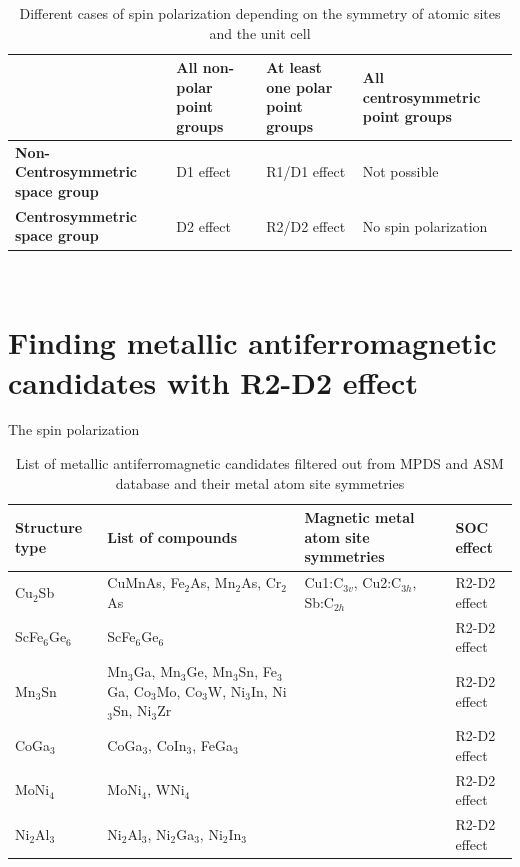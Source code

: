 \documentclass[11pt,edeposit,draftthesis]{uiucthesis2020}
\begin{document}
\begin{mainmatter}
\begin{table}
\caption{\label{tab:RD_effect} 
Different cases of spin polarization depending on the symmetry of atomic sites and the unit cell \cite{Zhang2014}}
\centering
\begin{tabular}{>{\raggedright\arraybackslash}p{5cm}>{\raggedright\arraybackslash}p{3cm}>{\raggedright\arraybackslash}p{3cm}>{\raggedright\arraybackslash}p{3cm}}
\hline\hline
\textbf{} & \textbf{All non-polar point groups} & \textbf{At least one polar point groups} & \textbf{All centrosymmetric point groups}\\
\hline
\textbf{Non-Centrosymmetric space group} & D1 effect & R1/D1 effect & Not possible\\
\hline
\textbf{Centrosymmetric space group} & D2 effect & R2/D2 effect & No spin polarization\\
\hline\hline
\end{tabular}
~\\
\end{table}

\section{Finding metallic antiferromagnetic candidates with R2-D2 effect}

The spin polarization 

\begin{table}
\caption{\label{tab:metallic_afm_candidates} 
List of metallic antiferromagnetic candidates filtered out from MPDS and ASM database and their metal atom site symmetries}
\begin{tabular}{>{\raggedright\arraybackslash}p{3cm}>{\raggedright\arraybackslash}p{4cm}>{\raggedright\arraybackslash}p{4cm}>{\raggedright\arraybackslash}p{3cm}}
\hline\hline
\textbf{Structure type} & \textbf{List of compounds} & \textbf{Magnetic metal atom site symmetries} & \textbf{SOC effect}\\
\hline\hline
Cu$_2$Sb & CuMnAs, Fe$_2$As, Mn$_2$As, Cr$_2$As & Cu1:C$_{3v}$, Cu2:C$_{3h}$, Sb:C$_{2h}$ & R2-D2 effect\\
\hline
ScFe$_6$Ge$_6$ & ScFe$_6$Ge$_6$ & & R2-D2 effect\\
\hline
Mn$_3$Sn & Mn$_3$Ga, Mn$_3$Ge, Mn$_3$Sn, Fe$_3$Ga, Co$_3$Mo, Co$_3$W, Ni$_3$In, Ni$_3$Sn, Ni$_3$Zr &  & R2-D2 effect\\
\hline
CoGa$_3$ & CoGa$_3$, CoIn$_3$, FeGa$_3$ &  & R2-D2 effect\\
\hline
MoNi$_4$ & MoNi$_4$, WNi$_4$ &  & R2-D2 effect\\
\hline
Ni$_2$Al$_3$ & Ni$_2$Al$_3$, Ni$_2$Ga$_3$, Ni$_2$In$_3$ & & R2-D2 effect\\
\hline\hline
\end{tabular}
~\\
\end{table}


\end{mainmatter}
\end{document}
